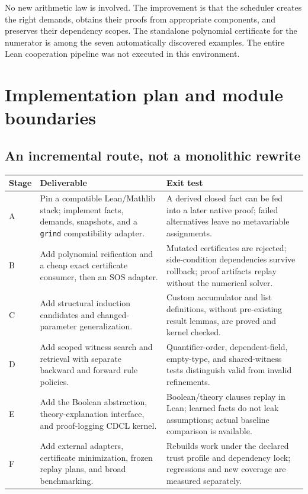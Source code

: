 \documentclass[11pt,letterpaper]{article}
\newcommand{\grind}{\texttt{grind}}
\theoremstyle{definition}\newtheorem{definition}[proposition]{Definition}
\begin{document}
No new arithmetic law is involved. The improvement is that the scheduler creates the right demands, obtains their proofs from appropriate components, and preserves their dependency scopes. The standalone polynomial certificate for the numerator is among the seven automatically discovered examples. The entire Lean cooperation pipeline was not executed in this environment.

\section{Implementation plan and module boundaries}
\label{sec:implementation}
\subsection{An incremental route, not a monolithic rewrite}
\begin{longtable}{@{}P{0.10\textwidth}P{0.42\textwidth}P{0.42\textwidth}@{}}
\toprule
Stage & Deliverable & Exit test \\
\midrule\endhead
A & Pin a compatible Lean/Mathlib stack; implement facts, demands, snapshots, and a \grind{} compatibility adapter. & A derived closed fact can be fed into a later native proof; failed alternatives leave no metavariable assignments. \\
B & Add polynomial reification and a cheap exact certificate consumer, then an SOS adapter. & Mutated certificates are rejected; side-condition dependencies survive rollback; proof artifacts replay without the numerical solver. \\
C & Add structural induction candidates and changed-parameter generalization. & Custom accumulator and list definitions, without pre-existing result lemmas, are proved and kernel checked. \\
D & Add scoped witness search and retrieval with separate backward and forward rule policies. & Quantifier-order, dependent-field, empty-type, and shared-witness tests distinguish valid from invalid refinements. \\
E & Add the Boolean abstraction, theory-explanation interface, and proof-logging CDCL kernel. & Boolean/theory clauses replay in Lean; learned facts do not leak assumptions; actual baseline comparison is available. \\
F & Add external adapters, certificate minimization, frozen replay plans, and broad benchmarking. & Rebuilds work under the declared trust profile and dependency lock; regressions and new coverage are measured separately. \\
\bottomrule
\end{longtable}
\end{document}
